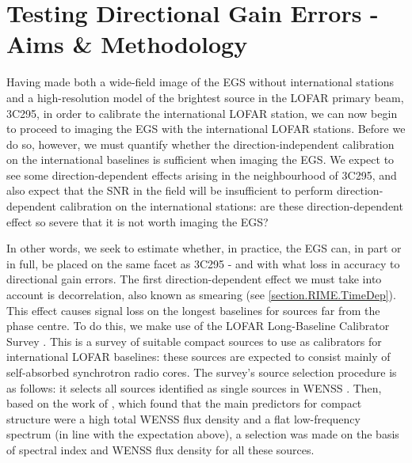 \section{Testing Directional Gain Errors - Aims \& Methodology}

\pg
Having made both a wide-field image of the EGS without international stations and a high-resolution model of the brightest source in the LOFAR primary beam, 3C295, in order to calibrate the international LOFAR station, we can now begin to proceed to imaging the EGS with the international LOFAR stations.
Before we do so, however, we must quantify whether the direction-independent calibration on the international baselines is sufficient when imaging the EGS. We expect to see some direction-dependent effects arising in the neighbourhood of 3C295, and also expect that the SNR in the field will be insufficient to perform direction-dependent calibration on the international stations: are these direction-dependent effect so severe that it is not worth imaging the EGS?

\pg
In other words, we seek to estimate whether, in practice, the EGS can, in part or in full, be placed on the same facet as 3C295 - and with what loss in accuracy to directional gain errors. The first direction-dependent effect we must take into account is decorrelation, also known as smearing (see \cref{section.RIME.TimeDep}). This effect causes signal loss on the longest baselines for sources far from the phase centre. To do this, we make use of the LOFAR Long-Baseline Calibrator Survey . This is a survey of suitable compact sources to use as calibrators for international LOFAR baselines: these sources are expected to consist mainly of self-absorbed synchrotron radio cores. The survey's source selection procedure is as follows: it selects all sources identified as single sources in WENSS . Then, based on the work of , which found that the main predictors for compact structure were a high total WENSS flux density and a flat low-frequency spectrum (in line with the expectation above), a selection was made on the basis of spectral index and WENSS flux density for all these sources. %


